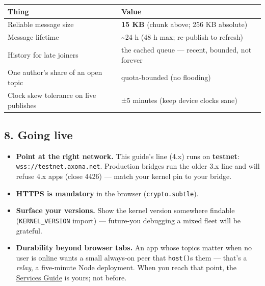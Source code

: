 \documentclass[
  nobib]{tufte-handout}
\newcounter{none} %
\providecommand{\tightlist}{%
  \setlength{\itemsep}{0pt}\setlength{\parskip}{0pt}}
\begin{document}
{\def\LTcaptype{none} %
\begin{longtable}[]{@{}
  >{\raggedright\arraybackslash}p{}
  >{\raggedright\arraybackslash}p{}@{}}
\toprule\noalign{}
\begin{minipage}[b]{\linewidth}\raggedright
Thing
\end{minipage} & \begin{minipage}[b]{\linewidth}\raggedright
Value
\end{minipage} \\
\midrule\noalign{}
\endhead
\bottomrule\noalign{}
\endlastfoot
Reliable message size & \textbf{15 KB} (chunk above; 256 KB absolute) \\
Message lifetime & \textasciitilde24 h (48 h max; re-publish to
refresh) \\
History for late joiners & the cached queue --- recent, bounded, not
forever \\
One author's share of an open topic & quota-bounded (no flooding) \\
Clock skew tolerance on live publishes & ±5 minutes (keep device clocks
sane) \\
\end{longtable}
}

\subsection{8. Going live}\label{going-live}

\begin{itemize}
\tightlist
\item
  \textbf{Point at the right network.} This guide's line (4.x) runs on
  \textbf{testnet}: \texttt{wss://testnet.axona.net}. Production bridges
  run the older 3.x line and will refuse 4.x apps (close 4426) --- match
  your kernel pin to your bridge.
\item
  \textbf{HTTPS is mandatory} in the browser (\texttt{crypto.subtle}).
\item
  \textbf{Surface your versions.} Show the kernel version somewhere
  findable (\texttt{KERNEL\_VERSION} import) --- future-you debugging a
  mixed fleet will be grateful.
\item
  \textbf{Durability beyond browser tabs.} An app whose topics matter
  when no user is online wants a small always-on peer that
  \texttt{host()}s them --- that's a \emph{relay}, a five-minute Node
  deployment. When you reach that point, the
  \href{Axona-Services-Guide-v4.16.1.md}{Services Guide} is yours; not
  before.
\end{itemize}
\end{document}
